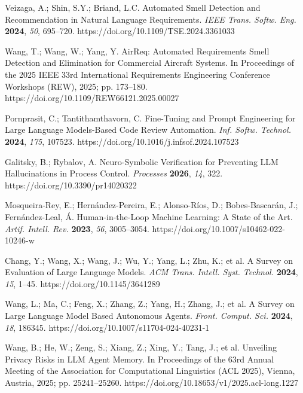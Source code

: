Veizaga, A.; Shin, S.Y.; Briand, L.C. Automated Smell Detection and Recommendation in Natural Language Requirements. {\em IEEE Trans. Softw. Eng.} {\bf 2024}, {\em 50}, 695--720. https://doi.org/10.1109/TSE.2024.3361033

Wang, T.; Wang, W.; Yang, Y. AirReq: Automated Requirements Smell Detection and Elimination for Commercial Aircraft Systems. In Proceedings of the 2025 IEEE 33rd International Requirements Engineering Conference Workshops (REW), 2025; pp. 173--180. https://doi.org/10.1109/REW66121.2025.00027

Pornprasit, C.; Tantithamthavorn, C. Fine-Tuning and Prompt Engineering for Large Language Models-Based Code Review Automation. {\em Inf. Softw. Technol.} {\bf 2024}, {\em 175}, 107523. https://doi.org/10.1016/j.infsof.2024.107523

Galitsky, B.; Rybalov, A. Neuro-Symbolic Verification for Preventing LLM Hallucinations in Process Control. {\em Processes} {\bf 2026}, {\em 14}, 322. https://doi.org/10.3390/pr14020322

Mosqueira-Rey, E.; Hern\'andez-Pereira, E.; Alonso-R\'ios, D.; Bobes-Bascar\'an, J.; Fern\'andez-Leal, \'A. Human-in-the-Loop Machine Learning: A State of the Art. {\em Artif. Intell. Rev.} {\bf 2023}, {\em 56}, 3005--3054. https://doi.org/10.1007/s10462-022-10246-w

Chang, Y.; Wang, X.; Wang, J.; Wu, Y.; Yang, L.; Zhu, K.; et al. A Survey on Evaluation of Large Language Models. {\em ACM Trans. Intell. Syst. Technol.} {\bf 2024}, {\em 15}, 1--45. https://doi.org/10.1145/3641289

Wang, L.; Ma, C.; Feng, X.; Zhang, Z.; Yang, H.; Zhang, J.; et al. A Survey on Large Language Model Based Autonomous Agents. {\em Front. Comput. Sci.} {\bf 2024}, {\em 18}, 186345. https://doi.org/10.1007/s11704-024-40231-1

Wang, B.; He, W.; Zeng, S.; Xiang, Z.; Xing, Y.; Tang, J.; et al. Unveiling Privacy Risks in LLM Agent Memory. In Proceedings of the 63rd Annual Meeting of the Association for Computational Linguistics (ACL 2025), Vienna, Austria, 2025; pp. 25241--25260. https://doi.org/10.18653/v1/2025.acl-long.1227

